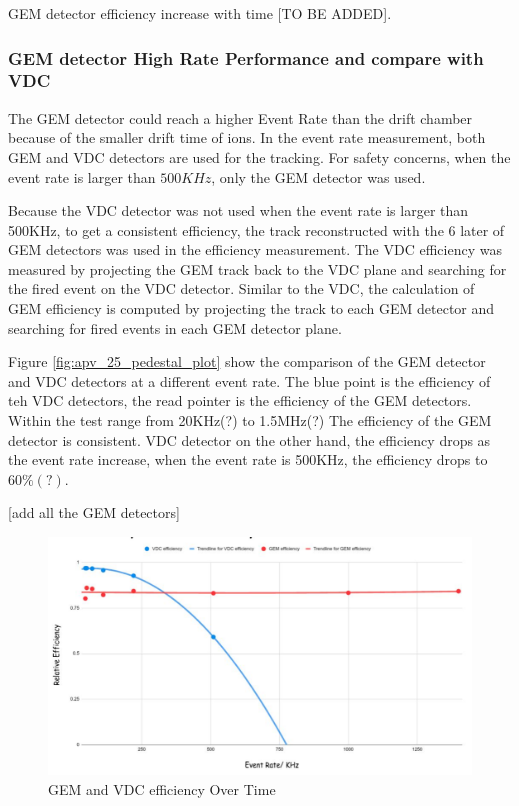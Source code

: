GEM detector efficiency increase with time [TO BE ADDED]. 

\subsubsection{GEM detector High Rate Performance and compare with VDC}

The GEM detector could reach a higher Event Rate than the drift chamber because of the smaller drift time of ions. In the event rate measurement, both GEM and VDC detectors are used for the tracking. For safety concerns, when the event rate is larger than $500KHz$, only the GEM detector was used. 

Because the VDC detector was not used when the event rate is larger than 500KHz, to get a consistent efficiency, the track reconstructed with the 6 later of GEM detectors was used in the efficiency measurement. The VDC efficiency was measured by projecting the GEM track back to the VDC plane and searching for the fired event on the VDC detector. Similar to the VDC, the calculation of GEM efficiency is computed by projecting the track to each GEM detector and searching for fired events in each GEM detector plane. 

Figure \ref{fig:apv_25_pedestal_plot} show the comparison of the GEM detector and VDC detectors at a different event rate. The blue point is the efficiency of teh VDC detectors, the read pointer is the efficiency of the GEM detectors. Within the test range from 20KHz(?) to 1.5MHz(?) The efficiency of the GEM detector is consistent. VDC detector on the other hand, the efficiency drops as the event rate increase, when the event rate is 500KHz, the efficiency drops to $60\%(?)$.  

[add all the GEM detectors]



\begin{figure}[!htbp]
    \centering
    \includegraphics[width=\textwidth]{images/chap5/gem efficiency over time.png}
    \caption{GEM and VDC efficiency Over Time}
    \label{fig:gem_efficiency_over_time}
\end{figure}